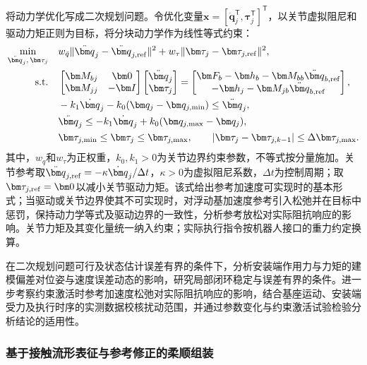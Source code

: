 将动力学优化写成二次规划问题。令优化变量$\bm x=[\ddot{\bm q}_j^{\mathsf T},\bm\tau_j^{\mathsf T}]^{\mathsf T}$，以关节虚拟阻尼和驱动力矩正则为目标，将分块动力学作为线性等式约束：
\begin{equation}
\begin{aligned}
 \min_{\ddot{\bm q}_j,\,\bm\tau_j}\quad &
 w_{\ddot q}\|\ddot{\bm q}_j-\ddot{\bm q}_{j,\rm ref}\|^2
 +w_\tau\|\bm\tau_j-\bm\tau_{j,\rm ref}\|^2,\\
 \mathrm{s.t.}\quad &
 \begin{bmatrix}\bm M_{bj}&\bm 0\\\bm M_{jj}&-\bm I\end{bmatrix}
 \begin{bmatrix}\ddot{\bm q}_j\\\bm\tau_j\end{bmatrix}
 =\begin{bmatrix}
 \bm F_b-\bm h_b-\bm M_{bb}\ddot{\bm q}_{b,\rm ref}\\
 -\bm h_j-\bm M_{jb}\ddot{\bm q}_{b,\rm ref}
 \end{bmatrix},\\
 &-k_1\dot{\bm q}_j-k_0(\bm q_j-\bm q_{j,\min})
 \le\ddot{\bm q}_j,\\
 &\ddot{\bm q}_j\le-k_1\dot{\bm q}_j+k_0(\bm q_{j,\max}-\bm q_j),\\
 &\bm\tau_{j,\min}\le\bm\tau_j\le\bm\tau_{j,\max},\qquad
 |\bm\tau_j-\bm\tau_{j,k-1}|\le\Delta\bm\tau_{j,\max}.
\end{aligned}
\label{eq:qp}
\end{equation}
其中，$w_{\ddot q}$和$w_\tau$为正权重，$k_0,k_1>0$为关节边界约束参数，不等式按分量施加。关节参考取$\ddot{\bm q}_{j,\rm ref}=-\kappa\dot{\bm q}_j/\Delta t$，$\kappa>0$为虚拟阻尼系数，$\Delta t$为控制周期；取$\bm\tau_{j,\rm ref}=\bm 0$以减小关节驱动力矩。该式给出参考加速度可实现时的基本形式；当驱动或关节边界使其不可实现时，对浮动基加速度参考引入松弛并在目标中惩罚，保持动力学等式及驱动边界的一致性，分析参考放松对实际阻抗响应的影响。关节力矩及其变化量统一纳入约束；实际执行指令按机器人接口的重力约定换算。

在二次规划问题可行及状态估计误差有界的条件下，分析安装端作用力与力矩的建模偏差对位姿与速度误差动态的影响，研究局部闭环稳定与误差有界的条件。进一步考察约束激活时参考加速度松弛对实际阻抗响应的影响，结合基座运动、安装端受力及执行时序的实测数据校核扰动范围，并通过参数变化与约束激活试验检验分析结论的适用性。

\subsubsection{基于接触流形表征与参考修正的柔顺组装}

